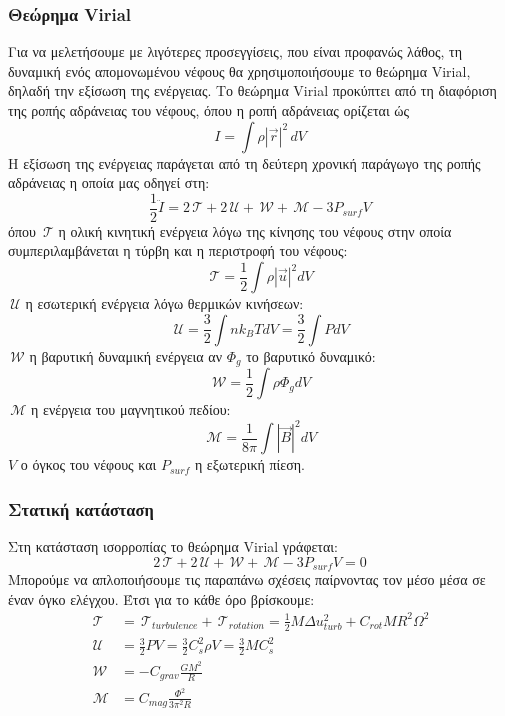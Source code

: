 \documentclass[a4paper,11pt]{memoir}
\newcommand{\TT}{\,\mathcal{T}}
\newcommand{\UU}{\,\mathcal{U}}
\newcommand{\WW}{\,\mathcal{W}}
\newcommand{\MM}{\,\mathcal{M}}
\begin{document}
\subsubsection{Θεώρημα Virial}
Για να μελετήσουμε με λιγότερες προσεγγίσεις, που είναι προφανώς λάθος, τη δυναμική ενός απομονωμένου νέφους θα χρησιμοποιήσουμε το θεώρημα Virial, δηλαδή την εξίσωση της ενέργειας.
Το θεώρημα Virial προκύπτει από τη διαφόριση της ροπής αδράνειας του νέφους, όπου η ροπή αδράνειας ορίζεται ώς 
\begin{equation}
I=\int \rho |\vec{r}|^2 \, dV
\end{equation}
Η εξίσωση της ενέργειας παράγεται από τη δεύτερη χρονική παράγωγο της ροπής αδράνειας η οποία μας οδηγεί στη:
\begin{equation}
\frac{1}{2}\ddot{I}=2\TT+2\UU +\WW+\MM -3P_{surf}V
\end{equation}
όπου $\TT$ η ολική κινητική ενέργεια λόγω της κίνησης του νέφους στην οποία συμπεριλαμβάνεται η τύρβη και η περιστροφή του νέφους:
\begin{equation}
\TT = \frac{1}{2} \int \rho |\vec{u}|^2 dV
\end{equation}
$\UU$ η εσωτερική ενέργεια λόγω θερμικών κινήσεων:
\begin{equation}
\UU=\frac{3}{2} \int n k_B T dV=\frac{3}{2} \int P dV
\end{equation}
$\WW$ η βαρυτική δυναμική ενέργεια αν $\Phi _g$ το βαρυτικό δυναμικό:
\begin{equation}
\WW=\frac{1}{2} \int \rho \Phi _g dV
\end{equation}
$\MM$ η ενέργεια του μαγνητικού πεδίου:
\begin{equation}
\MM=\frac{1}{8\pi} \int |\vec{B}|^2 dV
\end{equation}
$V$ ο όγκος του νέφους και $P_{surf}$ η εξωτερική πίεση. 
\subsubsection{Στατική κατάσταση}
Στη κατάσταση ισορροπίας το θεώρημα Virial γράφεται:
\begin{equation}
\label{eq:Virial}
2\TT+2\UU +\WW+\MM -3P_{surf}V=0
\end{equation}
Μπορούμε να απλοποιήσουμε τις παραπάνω σχέσεις παίρνοντας τον μέσο μέσα σε έναν όγκο ελέγχου. Έτσι για το κάθε όρο βρίσκουμε:
\begin{align}
\TT &= \TT_{turbulence}+\TT_{rotation} = \frac{1}{2} M \Delta u_{turb} ^2 + C_{rot} M R^2 \Omega ^2\\
\UU &= \frac{3}{2} P V=\frac{3}{2} C_s ^2 \rho V=\frac{3}{2} M C_s ^2 \\
\WW &= -C_{grav} \frac{GM^2}{R} \\
\MM & = C_{mag}\frac{\Phi^2}{3 \pi ^2 R}
\end{align}
\noindent
\end{document}

